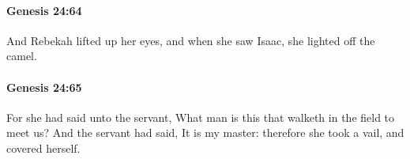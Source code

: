 		\paragraph{Genesis 24:64} %
			\label{GENESIS-24-64}

			And Rebekah lifted up her eyes, and when she saw Isaac, she lighted off the camel.


		\paragraph{Genesis 24:65} %
			\label{GENESIS-24-65}

			For she had said unto the servant, What man is this that walketh in the field to meet us? And the servant had said, It is my master: therefore she took a vail, and covered herself.


